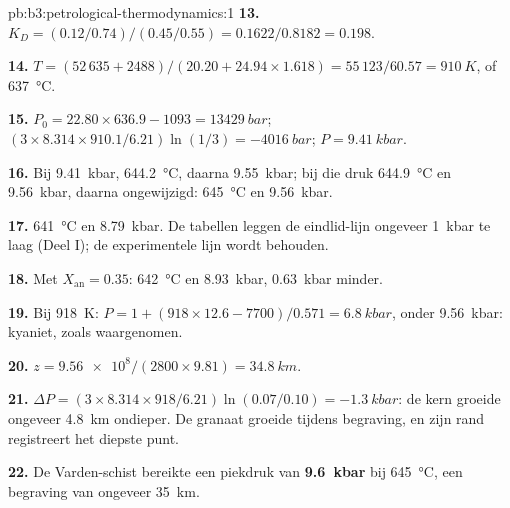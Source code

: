 \begin{solution}{pb:b3:petrological-thermodynamics:1}
\textbf{13.} $K_D = (0.12/0.74)/(0.45/0.55) = 0.1622/0.8182 = 0.198$.

\textbf{14.} $T = (52\,635 + 2488)/(20.20 + 24.94\times1.618) = 55\,123/60.57
= \qty{910}{K}$, of \qty{637}{\celsius}.

\textbf{15.} $P_0 = 22.80\times636.9 - 1093 = \qty{13429}{bar}$; $(3\times8.314
\times910.1/6.21)\ln(1/3) = \qty{-4016}{bar}$; $P = \qty{9.41}{kbar}$.

\textbf{16.} Bij \qty{9.41}{kbar}, \qty{644.2}{\celsius}, daarna
\qty{9.55}{kbar}; bij die druk \qty{644.9}{\celsius} en
\qty{9.56}{kbar}, daarna ongewijzigd: \qty{645}{\celsius} en
\qty{9.56}{kbar}.

\textbf{17.} \qty{641}{\celsius} en \qty{8.79}{kbar}. De tabellen leggen de
eindlid-lijn ongeveer \qty{1}{kbar} te laag (Deel I); de experimentele lijn
wordt behouden.

\textbf{18.} Met $X_{\text{an}} = 0.35$: \qty{642}{\celsius} en
\qty{8.93}{kbar}, \qty{0.63}{kbar} minder.

\textbf{19.} Bij \qty{918}{K}: $P = 1 + (918\times12.6 - 7700)/0.571 =
\qty{6.8}{kbar}$, onder \qty{9.56}{kbar}: kyaniet, zoals waargenomen.

\textbf{20.} $z = \num{9.56e8}/(2800\times9.81) = \qty{34.8}{km}$.

\textbf{21.} $\Delta P = (3\times8.314\times918/6.21)\ln(0.07/0.10) =
\qty{-1.3}{kbar}$: de kern groeide ongeveer \qty{4.8}{km} ondieper. De granaat
groeide tijdens begraving, en zijn rand registreert het diepste punt.

\textbf{22.} De Varden-schist bereikte een piekdruk van
\textbf{\qty[text-series-to-math=true]{9.6}{kbar}} bij
\qty{645}{\celsius}, een begraving van ongeveer \qty{35}{km}.
\end{solution}
